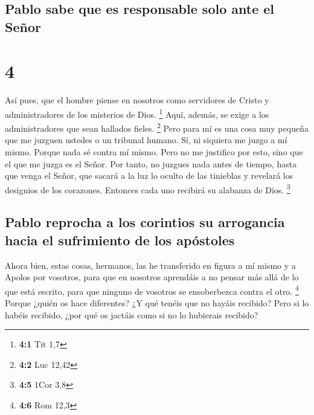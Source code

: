 \hypertarget{pablo-sabe-que-es-responsable-solo-ante-el-seuxf1or}{%
\subsection{Pablo sabe que es responsable solo ante el
Señor}\label{pablo-sabe-que-es-responsable-solo-ante-el-seuxf1or}}

\hypertarget{section-3}{%
\section{4}\label{section-3}}

 Así pues, que el hombre piense en nosotros como
servidores de Cristo y administradores de los misterios de Dios.
\footnote{\textbf{4:1} Tit 1,7}  Aquí, además, se exige a
los administradores que sean hallados fieles. \footnote{\textbf{4:2} Luc
  12,42}  Pero para mí es una cosa muy pequeña que me
juzguen ustedes o un tribunal humano. Sí, ni siquiera me juzgo a mí
mismo.  Porque nada sé contra mí mismo. Pero no me
justifico por esto, sino que el que me juzga es el Señor. 
Por tanto, no juzgues nada antes de tiempo, hasta que venga el Señor,
que sacará a la luz lo oculto de las tinieblas y revelará los designios
de los corazones. Entonces cada uno recibirá su alabanza de Dios.
\footnote{\textbf{4:5} 1Cor 3,8}

\hypertarget{pablo-reprocha-a-los-corintios-su-arrogancia-hacia-el-sufrimiento-de-los-apuxf3stoles}{%
\subsection{Pablo reprocha a los corintios su arrogancia hacia el
sufrimiento de los
apóstoles}\label{pablo-reprocha-a-los-corintios-su-arrogancia-hacia-el-sufrimiento-de-los-apuxf3stoles}}

 Ahora bien, estas cosas, hermanos, las he transferido en
figura a mí mismo y a Apolos por vosotros, para que en nosotros
aprendáis a no pensar más allá de lo que está escrito, para que ninguno
de vosotros se ensoberbezca contra el otro. \footnote{\textbf{4:6} Rom
  12,3}  Porque ¿quién os hace diferentes? ¿Y qué tenéis
que no hayáis recibido? Pero si lo habéis recibido, ¿por qué os jactáis
como si no lo hubierais recibido?


